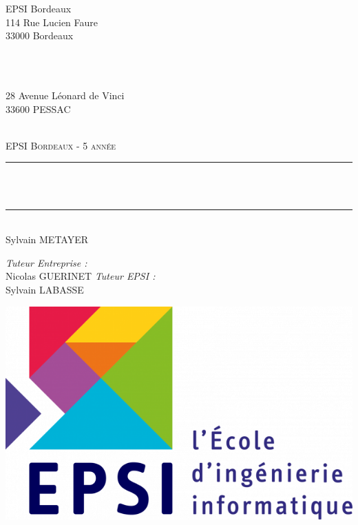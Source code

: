 \begin{titlepage}

\newcommand{\HRule}{\rule{\linewidth}{0.5mm}} %

\center %
 
\begin{minipage}{0.4\textwidth}
	\begin{flushleft} \large
		EPSI Bordeaux\\
		114 Rue Lucien Faure\\
		33000 Bordeaux
	\end{flushleft}
\end{minipage}
~
\begin{minipage}{0.4\textwidth}
	\begin{flushright} \large
		\onepoint\\
		28 Avenue Léonard de Vinci \\
		33600 PESSAC
	\end{flushright}
\end{minipage}\\[2cm]


\textsc{\LARGE EPSI Bordeaux - 5 année}\\[1.0cm]

\space

\HRule \\[0.4cm]
{ \huge \bfseries 
\problematique
}\\[0.4cm]
\HRule \\[1.5cm]

\LARGE Sylvain \textsc{METAYER}\\[2cm] %

\begin{flushleft} \large
	\emph{Tuteur Entreprise :}\\
	Nicolas \textsc{GUERINET}
	\newline\newline
	\emph{Tuteur EPSI :} \\
	Sylvain \textsc{LABASSE}
\end{flushleft}

\includegraphics[scale=0.2]{img/epsi.png}\\[1cm] 


\end{titlepage}
